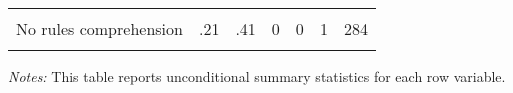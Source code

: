 \begin{table}[htbp]
{\begin{threeparttable}
\begin{tabular}{l*{6}{c}}
          &         &         &         &         &         &         \\
No rules comprehension&      .21&      .41&        0&        0&        1&      284\\
          &         &         &         &         &         &         \\
\bottomrule \end{tabular} \begin{tablenotes}[flushleft] \footnotesize \item \emph{Notes:} This table reports unconditional summary statistics for each row variable. \end{tablenotes} \end{threeparttable} } \end{table}
